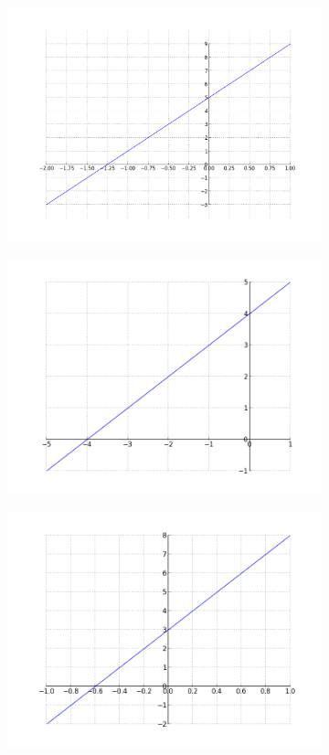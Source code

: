 \documentclass[12pt,twoside,onecolumn]{article}
\begin{document}
\begin{Exercise}
\begin{figure}[h!]
\begin{subfigure}{.5\textwidth}
    \centering
    \includegraphics[scale = 0.4]{figures/4Xp5.png}
    \end{subfigure}
    \begin{subfigure}{.5\textwidth}
    \centering
    \includegraphics[scale = 0.5]{figures/Xp4.png}
    \end{subfigure}%
    \begin{subfigure}{.5\textwidth}
    \centering
    \includegraphics[scale = 0.5]{figures/5Xp3.png}

\end{subfigure}
\end{figure}
\end{Exercise}
\end{document}
